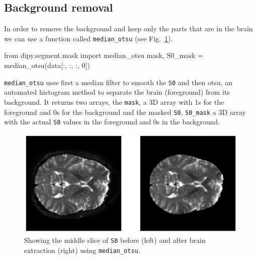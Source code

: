 \documentclass{bioinfo}
\begin{document}
\subsection{Background removal}
In order to remove the background and keep only the parts that are in the brain
we can use a function called \texttt{median\_otsu} (see Fig.~\ref{Fig:brain_segmentation}).
\begin{python}
from dipy.segment.mask import median_otsu
mask, S0_mask = median_otsu(data[:, :, :, 0])
\end{python}
\texttt{median\_otsu} uses first a median filter to smooth the \texttt{S0} and
then otsu, an automated histogram method \cite{Otsu1979} to separate the brain
(foreground) from its background. It returns two arrays, the \texttt{mask}, a
3D array with 1s for the foreground and 0s for the background and the masked
\texttt{S0}, \texttt{S0\_mask} a 3D array with the actual \texttt{S0} values in
the foreground and 0s in the background.

\begin{figure}
\includegraphics[scale=0.55]{Figures/brain_segmentation.eps}
\centering{}
\caption{Showing the middle slice of \texttt{S0} before (left) and after brain extraction (right) using \texttt{median\_otsu}. \label{Fig:brain_segmentation}}
\end{figure}
\end{document}
